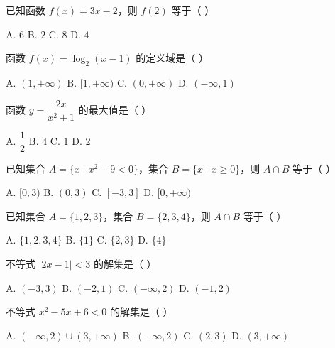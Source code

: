 \documentclass[11pt, a4paper]{article}
\begin{document}
\begin{baitap}[29]
已知函数 $f(x) = 3x - 2$，则 $f(2)$ 等于（ ）
\par\vspace{3pt}
\noindent A. $6$ \quad B. $2$ \quad C. $8$ \quad D. $4$
\end{baitap}

\begin{baitap}[30]
函数 $f(x) = \log_2(x - 1)$ 的定义域是（ ）
\par\vspace{3pt}
\noindent A. $(1, +\infty)$ \quad B. $[1, +\infty)$ \quad C. $(0, +\infty)$ \quad D. $(-\infty, 1)$
\end{baitap}

\begin{baitap}[31]
函数 $y = \dfrac{2x}{x^2 + 1}$ 的最大值是（ ）
\par\vspace{3pt}
\noindent A. $\dfrac{1}{2}$ \quad B. $4$ \quad C. $1$ \quad D. $2$
\end{baitap}

\begin{baitap}[32]
已知集合 $A = \{x \mid x^2 - 9 < 0\}$，集合 $B = \{x \mid x \ge 0\}$，则 $A \cap B$ 等于（ ）
\par\vspace{3pt}
\noindent A. $[0, 3)$ \quad B. $(0, 3)$ \quad C. $[-3, 3]$ \quad D. $[0, +\infty)$
\end{baitap}

\begin{baitap}[33]
已知集合 $A = \{1, 2, 3\}$，集合 $B = \{2, 3, 4\}$，则 $A \cap B$ 等于（ ）
\par\vspace{3pt}
\noindent A. $\{1, 2, 3, 4\}$ \quad B. $\{1\}$ \quad C. $\{2, 3\}$ \quad D. $\{4\}$
\end{baitap}

\begin{baitap}[34]
不等式 $\lvert 2x - 1 \rvert < 3$ 的解集是（ ）
\par\vspace{3pt}
\noindent A. $(-3, 3)$ \quad B. $(-2, 1)$ \quad C. $(-\infty, 2)$ \quad D. $(-1, 2)$
\end{baitap}

\begin{baitap}[35]
不等式 $x^2 - 5x + 6 < 0$ 的解集是（ ）
\par\vspace{3pt}
\noindent A. $(-\infty, 2) \cup (3, +\infty)$ \quad B. $(-\infty, 2)$ \quad C. $(2, 3)$ \quad D. $(3, +\infty)$
\end{baitap}
\end{document}
